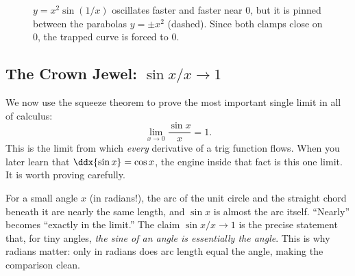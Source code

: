 \begin{figure}[h]
\centering
{}
\caption{$y = x^{2}\sin(1/x)$ oscillates faster and faster near $0$, but it is
pinned between the parabolas $y=\pm x^{2}$ (dashed). Since both clamps close on
$0$, the trapped curve is forced to $0$.}
\label{ch07:fig-squeeze}
\end{figure}

\subsection{The Crown Jewel: $\sin x / x \to 1$}
\label{ch07:sinx}

We now use the squeeze theorem to prove the most important single limit in all
of calculus:
\[
  \boxed{\;\lim_{x\to 0}\frac{\sin x}{x} = 1.\;}
\]
This is the limit from which \emph{every} derivative of a trig function flows.
When you later learn that $\ddx{\sin x} = \cos x$, the engine inside that fact
is this one limit. It is worth proving carefully.

\begin{intuitionbox}
For a small angle $x$ (in radians!), the arc of the unit circle and the
straight chord beneath it are nearly the same length, and $\sin x$ is almost
the arc itself. ``Nearly'' becomes ``exactly in the limit.'' The claim
$\sin x/x \to 1$ is the precise statement that, for tiny angles, \emph{the sine
of an angle is essentially the angle}. This is why radians matter: only in
radians does arc length equal the angle, making the comparison clean.
\end{intuitionbox}

